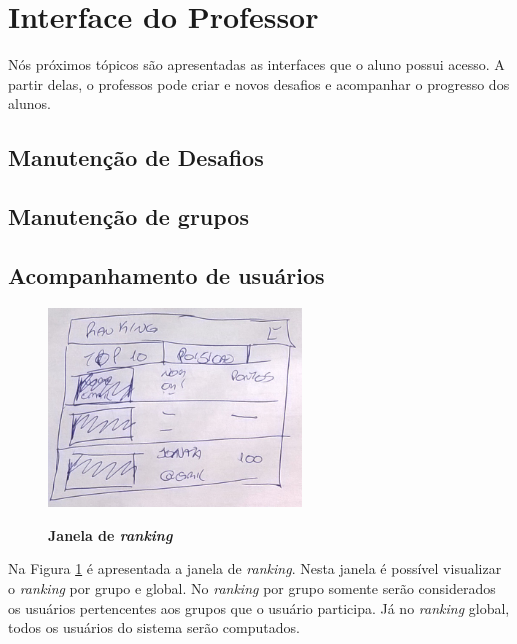 \documentclass[
	12pt,				%
	oneside,			%
	a4paper,			%
	english,			%
	french,				%
	spanish,			%
	brazil,				%
	]{abntex2}
\begin{document}
\section{Interface do Professor}

Nós próximos tópicos são apresentadas as interfaces que o aluno possui acesso. A partir delas, o professos pode criar e novos desafios e acompanhar o progresso dos alunos.


\subsection{Manutenção de Desafios}

\subsection{Manutenção de grupos}

\subsection{Acompanhamento de usuários}


\begin{figure}[ht]
\centering
\caption{\textbf{Janela de \textit{ranking}}}
\includegraphics[width=0.6\textwidth]{imagens/proposta_ranking.png}
\sourceAuthor
\label{fig:janelaRanking}
\end{figure}

Na Figura \ref{fig:janelaRanking} é apresentada a janela de \textit{ranking}. Nesta janela é possível visualizar o \textit{ranking} por grupo e global. No \textit{ranking} por grupo somente serão considerados os usuários pertencentes aos grupos que o usuário participa. Já no \textit{ranking} global, todos os usuários do sistema serão computados.
\end{document}
